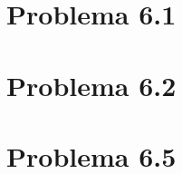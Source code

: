 \section{Problema 6.1}\label{problema6_1}
	
\newpage

\section{Problema 6.2}
	
\newpage

%	
%
%	

\section{Problema 6.5}
	



